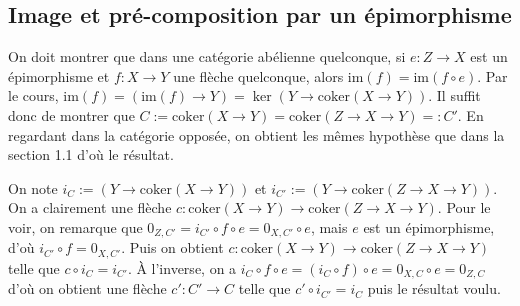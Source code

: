 \documentclass[a4paper,12pt]{article}
\newcommand{\im}{\textrm{im}}
\newcommand{\coker}{\textrm{coker}}
\theoremstyle{plain}
\theoremstyle{definition}
\theoremstyle{remark}
\begin{document}
\subsection{Image et pré-composition par un épimorphisme}
On doit montrer que dans une catégorie
abélienne quelconque, si $e\colon Z\to X$ est un épimorphisme et 
$f\colon X\to Y$ une flèche quelconque, alors $\im(f)=\im(f\circ e)$.
Par le cours, $\im(f)=(\im(f)\to Y)=\ker(Y\to \coker(X\to Y))$. Il 
suffit donc de montrer que $C:=\coker(X\to Y)=\coker(Z\to X\to Y)=:C'$.
En regardant dans la catégorie opposée, on obtient les mêmes
hypothèse que dans la section 1.1 d'où le résultat.

On note
$i_C:=(Y\to\coker(X\to Y))$ et $i_{C'}:=(Y\to\coker(Z\to X\to Y))$.
On a clairement une flèche 
$c\colon \coker(X\to Y)\to \coker(Z\to X\to Y)$. Pour le voir, on
remarque que $0_{Z,C'}=i_{C'}\circ f\circ e=0_{X,C'}\circ e$, mais 
$e$ est un épimorphisme, d'où $i_{C'}\circ f=0_{X,C'}$. Puis on obtient
$c\colon \coker(X\to Y)\to \coker(Z\to X\to Y)$ telle que $c\circ i_C=
i_{C'}$. À l'inverse, on a 
$i_C\circ f\circ e=(i_C\circ f)\circ e=0_{X,C}\circ e=0_{Z,C}$ d'où
on obtient une flèche $c'\colon C'\to C$ telle que $c'\circ i_{C'}=i_C$
puis le résultat voulu.
\end{document}
